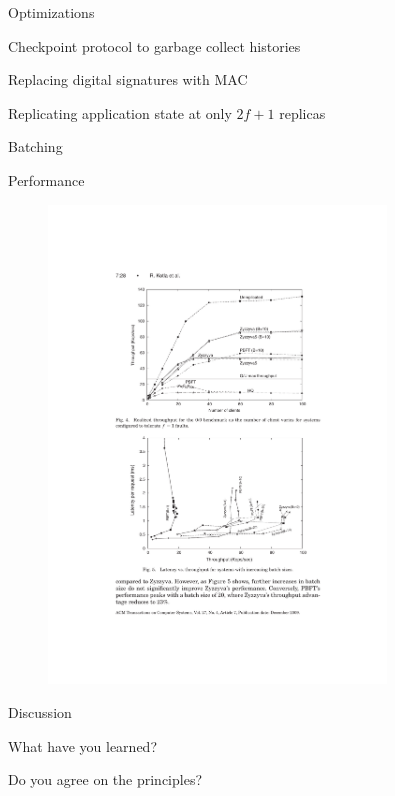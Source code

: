 \begin{frame}{Optimizations}
	
\BIL
\item Checkpoint protocol to garbage collect histories 
\item Replacing digital signatures with MAC
\item Replicating application state at only $2f +1$ replicas
\item Batching
\EIL

\end{frame}

\begin{frame}{Performance}

\begin{figure}
	\includegraphics[width=0.8\textwidth]{performance}
\end{figure}

\end{frame}

\begin{frame}{Discussion}

\BIL
\item What have you learned?
\item Do you agree on the principles?
\EIL
\end{frame}


